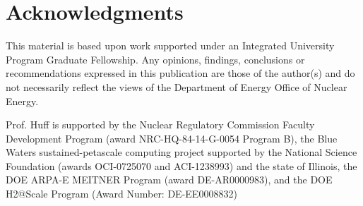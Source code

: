 \section{Acknowledgments}
This material is based upon work supported under an Integrated University 
Program Graduate Fellowship. Any opinions, findings, conclusions or 
recommendations expressed in this publication are those of the author(s) 
and do not necessarily reflect the views of the Department of Energy Office 
of Nuclear Energy.

Prof. Huff is supported by the Nuclear Regulatory Commission Faculty
Development Program (award NRC-HQ-84-14-G-0054 Program B), the Blue Waters
sustained-petascale computing project supported by the National Science
Foundation (awards OCI-0725070 and ACI-1238993) and the state of Illinois, the
DOE ARPA-E MEITNER Program (award DE-AR0000983), and the DOE H2@Scale Program
(Award Number: DE-EE0008832)
